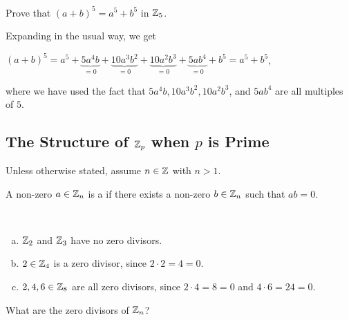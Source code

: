 \documentclass[11pt,fleqn,dvipsnames,usenames]{article}
\newcommand{\p}{\noindent}
\begin{document}
%
\begin{example}
Prove that $(a+b)^{5} = a^{5} + b^{5}$ in $\mathbb{Z}_5$.
\end{example}
\begin{solution}
Expanding in the usual way, we get
\begin{center}
$(a + b)^5 = a^{5} + \underbrace{5a^4b}_{=0} + \underbrace{10a^3b^2}_{=0} + \underbrace{10a^2b^3}_{=0} + \underbrace{5ab^4}_{=0} + b^5 = a^5 + b^5$,
\end{center}
where we have used the fact that $5a^4b, 10a^3b^2, 10a^2b^3$, and $5ab^4$ are all multiples of $5$.
\end{solution}
%

\subsection{The Structure of $\mathbb{Z}_p$ when $p$ is Prime}

\p Unless otherwise stated, assume $n\in\mathbb{Z}$ with $n > 1$.  

\begin{definition}
A non-zero $a\in\mathbb{Z}_{n}$ is a  if there exists a non-zero $b\in\mathbb{Z}_{n}$ such that $ab = 0$.
\end{definition}
%
\begin{examples}~
\begin{enumerate}[(a)]
\item $\mathbb{Z}_2$ and $\mathbb{Z}_3$ have no zero divisors.
\item $2\in\mathbb{Z}_4$ is a zero divisor, since $2\cdot 2 = 4 = 0$.
\item $2,4,6\in\mathbb{Z}_8$ are all zero divisors, since $2\cdot 4 = 8 = 0$ and $4\cdot 6 = 24 = 0$.
\end{enumerate}
\end{examples}
\vsp

\question What are the zero divisors of $\mathbb{Z}_{n}$?
\vsp
\end{document}
